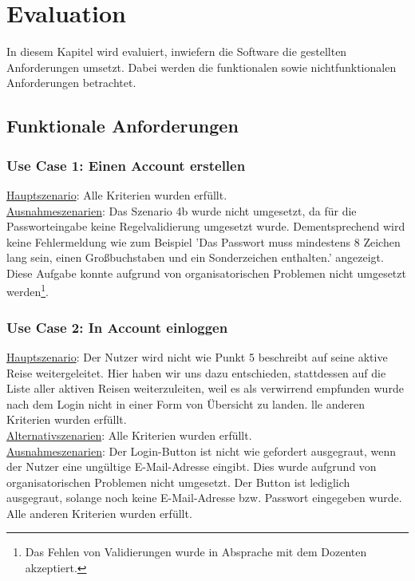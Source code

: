 \section{Evaluation}
In diesem Kapitel wird evaluiert, inwiefern die Software die gestellten Anforderungen umsetzt. Dabei werden die funktionalen sowie nichtfunktionalen Anforderungen betrachtet.

\subsection{Funktionale Anforderungen}\label{funktionale-anforderungen}

\subsubsection*{Use Case 1: Einen Account erstellen}
\begin{addmargin}{10pt}
\underline{Hauptszenario}: Alle Kriterien wurden erfüllt.\\
\underline{Ausnahmeszenarien}: Das Szenario 4b wurde nicht umgesetzt, da für die Passworteingabe keine Regelvalidierung umgesetzt wurde. 
Dementsprechend wird keine Fehlermeldung wie zum Beispiel 'Das Passwort muss mindestens 8 Zeichen lang sein, einen Großbuchstaben und ein Sonderzeichen enthalten.' angezeigt. 
Diese Aufgabe konnte aufgrund von organisatorischen Problemen nicht umgesetzt werden\footnote{Das Fehlen von Validierungen wurde in Absprache mit dem Dozenten akzeptiert.}.
\end{addmargin}

\subsubsection*{Use Case 2: In Account einloggen}

\begin{addmargin}{10pt}
\underline{Hauptszenario}: Der Nutzer wird nicht wie Punkt 5 beschreibt auf seine aktive Reise weitergeleitet. 
Hier haben wir uns dazu entschieden, stattdessen auf die Liste aller aktiven Reisen weiterzuleiten, weil es als verwirrend empfunden wurde nach dem Login nicht in einer Form von Übersicht zu landen. 
lle anderen Kriterien wurden erfüllt.\\
\underline{Alternativszenarien}: Alle Kriterien wurden erfüllt.\\
\underline{Ausnahmeszenarien}: Der Login-Button ist nicht wie gefordert ausgegraut, wenn der Nutzer eine ungültige E-Mail-Adresse eingibt. 
Dies wurde aufgrund von organisatorischen Problemen nicht umgesetzt.
Der Button ist lediglich ausgegraut, solange noch keine E-Mail-Adresse bzw. Passwort eingegeben wurde. 
Alle anderen Kriterien wurden erfüllt.
\end{addmargin}

